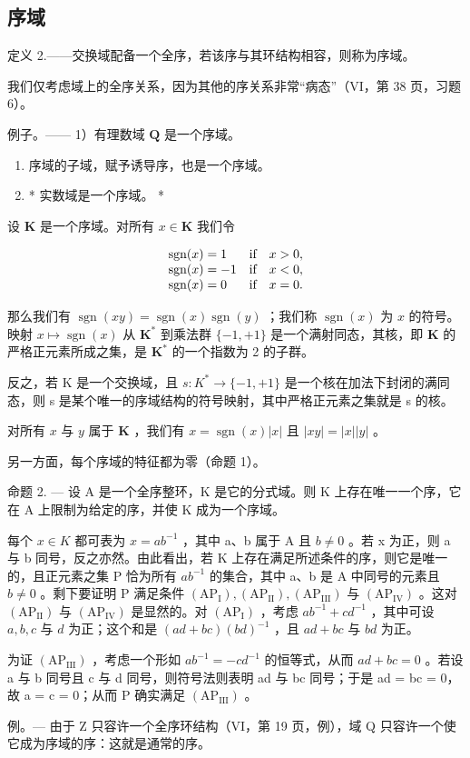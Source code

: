 \subsection{序域}

定义 2.——交换域配备一个全序，若该序与其环结构相容，则称为序域。

我们仅考虑域上的全序关系，因为其他的序关系非常“病态”（VI，第 38 页，习题 6）。

例子。—— 1）有理数域 \(\mathbf{Q}\) 是一个序域。

\begin{enumerate}
\def\labelenumi{\arabic{enumi})}
\setcounter{enumi}{1}
\item
  序域的子域，赋予诱导序，也是一个序域。
\item
  * 实数域是一个序域。 *
\end{enumerate}

设 \(\mathbf{K}\) 是一个序域。对所有 \(x\in \mathbf{K}\) 我们令

\[
\begin{array}{l l} \operatorname{sgn} (x) = 1 & \text {if} \quad x > 0, \\ \operatorname{sgn} (x) = - 1 & \text {if} \quad x <   0, \\ \operatorname{sgn} (x) = 0 & \text {if} \quad x = 0. \end{array}
\]

那么我们有 \(\operatorname{sgn}(xy) = \operatorname{sgn}(x)\operatorname{sgn}(y)\) ；我们称 \(\operatorname{sgn}(x)\) 为 \(x\) 的符号。映射 \(x \mapsto \operatorname{sgn}(x)\) 从 \(\mathbf{K}^*\) 到乘法群 \(\{-1, +1\}\) 是一个满射同态，其核，即 \(\mathbf{K}\) 的严格正元素所成之集，是 \(\mathbf{K}^*\) 的一个指数为 2 的子群。

反之，若 K 是一个交换域，且 \(s: K^{*} \to \{-1, +1\}\) 是一个核在加法下封闭的满同态，则 s 是某个唯一的序域结构的符号映射，其中严格正元素之集就是 s 的核。

对所有 \(x\) 与 \(y\) 属于 \(\mathbf{K}\) ，我们有 \(x = \operatorname{sgn}(x)|x|\) 且 \(|xy| = |x||y|\) 。

另一方面，每个序域的特征都为零（命题 1）。

命题 2. --- 设 A 是一个全序整环，K 是它的分式域。则 K 上存在唯一一个序，它在 A 上限制为给定的序，并使 K 成为一个序域。

每个 \(x \in K\) 都可表为 \(x = ab^{-1}\) ，其中 a、b 属于 A 且 \(b \neq 0\) 。若 x 为正，则 a 与 b 同号，反之亦然。由此看出，若 K 上存在满足所述条件的序，则它是唯一的，且正元素之集 P 恰为所有 \(ab^{-1}\) 的集合，其中 a、b 是 A 中同号的元素且 \(b \neq 0\) 。剩下要证明 P 满足条件 \((\mathrm{AP}_{\mathrm{I}}), (\mathrm{AP}_{\mathrm{II}}), (\mathrm{AP}_{\mathrm{III}})\) 与 \((\mathrm{AP}_{\mathrm{IV}})\) 。这对 \((\mathrm{AP}_{\mathrm{II}})\) 与 \((\mathrm{AP}_{\mathrm{IV}})\) 是显然的。对 \((\mathrm{AP}_{\mathrm{I}})\) ，考虑 \(ab^{-1} + cd^{-1}\) ，其中可设 \(a, b, c\) 与 \(d\) 为正；这个和是 \((ad + bc)(bd)^{-1}\) ，且 \(ad + bc\) 与 \(bd\) 为正。

为证 \((\mathrm{AP}_{\mathrm{III}})\) ，考虑一个形如 \(ab^{-1} = -cd^{-1}\) 的恒等式，从而 \(ad + bc = 0\) 。若设 a 与 b 同号且 c 与 d 同号，则符号法则表明 ad 与 bc 同号；于是 ad = bc = 0，故 a = c = 0；从而 P 确实满足 \((\mathrm{AP}_{\mathrm{III}})\) 。

例。--- 由于 Z 只容许一个全序环结构（VI，第 19 页，例），域 Q 只容许一个使它成为序域的序：这就是通常的序。

